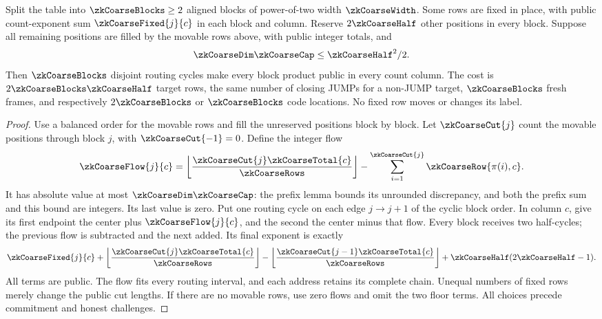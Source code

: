 \begin{theorem}\label{thm:zk-vector-coarse-frontier}
Split the table into $\zkCoarseBlocks\ge2$ aligned blocks of power-of-two width $\zkCoarseWidth$. Some rows are fixed in place, with public count-exponent sum $\zkCoarseFixed{j}{c}$ in each block and column. Reserve $2\zkCoarseHalf$ other positions in every block. Suppose all remaining positions are filled by the movable rows above, with public integer totals, and
\[
 \zkCoarseDim\zkCoarseCap\le\zkCoarseHalf^2/2.
\]
Then $\zkCoarseBlocks$ disjoint routing cycles make every block product public in every count column. The cost is $2\zkCoarseBlocks\zkCoarseHalf$ target rows, the same number of closing JUMPs for a non-JUMP target, $\zkCoarseBlocks$ fresh frames, and respectively $2\zkCoarseBlocks$ or $\zkCoarseBlocks$ code locations. No fixed row moves or changes its label.
\end{theorem}
\begin{proof}
Use a balanced order for the movable rows and fill the unreserved positions block by block. Let $\zkCoarseCut{j}$ count the movable positions through block $j$, with $\zkCoarseCut{-1}=0$. Define the integer flow
\[
 \zkCoarseFlow{j}{c}
 =\left\lfloor\frac{\zkCoarseCut{j}\zkCoarseTotal{c}}{\zkCoarseRows}\right\rfloor
  -\sum_{i=1}^{\zkCoarseCut{j}}\zkCoarseRow{\pi(i),c}.
\]
It has absolute value at most $\zkCoarseDim\zkCoarseCap$: the prefix lemma bounds its unrounded discrepancy, and both the prefix sum and this bound are integers. Its last value is zero. Put one routing cycle on each edge $j\to j+1$ of the cyclic block order. In column $c$, give its first endpoint the center plus $\zkCoarseFlow{j}{c}$, and the second the center minus that flow. Every block receives two half-cycles; the previous flow is subtracted and the next added. Its final exponent is exactly
\[
 \zkCoarseFixed{j}{c}
 +\left\lfloor\frac{\zkCoarseCut{j}\zkCoarseTotal{c}}{\zkCoarseRows}\right\rfloor
 -\left\lfloor\frac{\zkCoarseCut{j-1}\zkCoarseTotal{c}}{\zkCoarseRows}\right\rfloor
 +\zkCoarseHalf(2\zkCoarseHalf-1).
\]
All terms are public. The flow fits every routing interval, and each address retains its complete chain. Unequal numbers of fixed rows merely change the public cut lengths. If there are no movable rows, use zero flows and omit the two floor terms. All choices precede commitment and honest challenges.
\end{proof}


